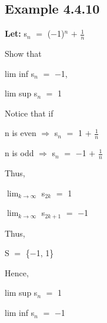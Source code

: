 \documentclass{article}
\newcommand{\mt}[1]{\ensuremath{#1}}
\newcommand\ssc[2][\DefaultOpt]{%
  \def\DefaultOpt{#2}%
  \subsection[#1]{#2}%
}
\newcommand{\lt}[1]{\textbf{Let: } #1}
\newcommand{\rar}{ \mt{\Rightarrow} }     %
\newcommand{\prn}[1]{(#1)}
\newcommand{\bk}[1]{\{#1\}}
\newcommand{\ps}{\mt{+} }
\newcommand{\eql}{\mt{=} }
\newcommand{\uw}[2]{#1\mt{_{#2}}}
\newcommand{\frc}[2]{\mt{\frac{#1}{#2}}}
\newcommand{\lmti}[1]{\mt{\displaystyle{\lim_{#1 \to \infty}}}}
\begin{document}
\newpage

\ssc{Example 4.4.10}{

\lt{\uw{s}{n} \eql \prn{$-$1}$^n$ \ps \frc{1}{n}}

Show that

lim inf \uw{s}{n} \eql $-$1,

lim sup \uw{s}{n} \eql 1

Notice that if

n is even \rar \uw{s}{n} \eql 1 \ps \frc{1}{n}

n is odd \rar \uw{s}{n} \eql $-$1 \ps \frc{1}{n}

Thus,

\lmti{k} \uw{s}{2k} \eql 1

\lmti{k} \uw{s}{2k + 1} \eql $-$1

Thus,

S \eql \bk{$-$1, 1}

Hence,

lim sup \uw{s}{n} \eql 1

lim inf \uw{s}{n} \eql $-$1

}
\end{document}
